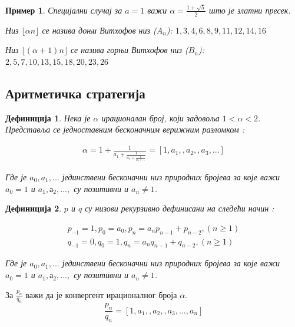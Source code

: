 \documentclass[a4paper]{article}
\newtheorem{example}{Пример}
\newtheorem{definition}{Дефиниција}
\begin{document}
\begin{example}
	Специјални случај за $ a = 1 $ важи $ \alpha = \frac{1 + \sqrt{5}}{2} $ што је златни пресек.
	
	Низ $ \lfloor \alpha n \rfloor $ се назива доњи Витхофов низ ($ A_{n} $):
	$ 1, 3, 4, 6, 8, 9, 11, 12, 14, 16 $
	
	Низ $ \lfloor (\alpha + 1) n \rfloor $ се назива горњи Витхофов низ ($ B_{n} $):
	$ 2, 5, 7, 10, 13, 15, 18, 20, 23, 26 $
\end{example}

\subsection{Аритметичка стратегија}

\begin{definition}
	\label{def:verizni_razlomak}	
	Нека је $ \alpha $ ирационалан број, који задовоља $ 1 < \alpha < 2 $. Представља се једноставним бесконачним верижним разломком :
	
	\begin{eqnarray}
	\alpha = 1 + \frac{1}{a_{1} + \frac{1}{a_{2} + \frac{1}{a_{3} + ...}}} = [1, a_{1}, , a_{2}, , a_{3}, ...] 
	\end{eqnarray}
	
	Где је $ a_{0}, a_{1}, ... $ јединствени бесконачни низ природних бројева за које важи $ a_{0} = 1 $ и $ a_{1}, а_{2}, ... ,  $ су позитивни и $ a_{n} \ne 1 $.
\end{definition}

\begin{definition}
	\label{def:p_q_nizovi}
	$ p $ и $ q $ су низови рекурзивно дефинисани на следећи начин :
	
	\begin{eqnarray}
		p_{-1} = 1, p_{0} = a_{0}, p_{n} = a_{n}p_{n-1} + p_{n-2}, (n \geq 1 )\\
		q_{-1} = 0, q_{0} = 1, q_{n} = a_{n}q_{n-1} + q_{n-2}, (n \geq 1 )
	\end{eqnarray}
	
	Где је $ a_{0}, a_{1}, ... $ јединствени бесконачни низ природних бројева за које важи $ a_{0} = 1 $ и $ a_{1}, а_{2}, ... ,  $ су позитивни и $ a_{n} \ne 1 $.
\end{definition}

За $ \frac{p_{n}}{q_{n}} $ важи да је конвергент ирационалног броја $ \alpha $.  
\begin{displaymath}
	\frac{p_{n}}{q_{n}} = [1, a_{1}, , a_{2}, , a_{3}, ..., a_{n}]
\end{displaymath}
\end{document}
